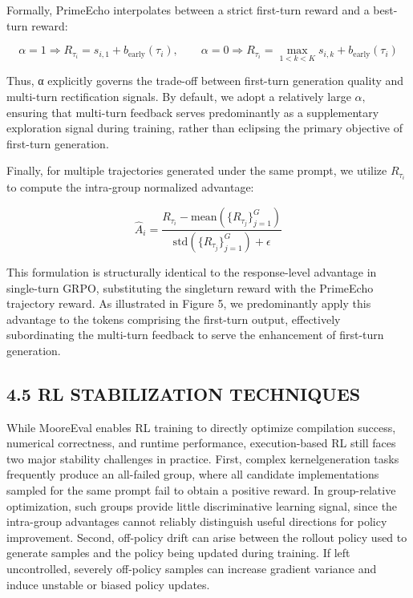 \documentclass[
  10
]{article}
\begin{document}
Formally, PrimeEcho interpolates between a strict first-turn reward and
a best-turn reward:

\[
\alpha = 1 \Rightarrow R _ {\tau_ {i}} = s _ {i, 1} + b _ {\mathrm{early}} (\tau_ {i}), \qquad \alpha = 0 \Rightarrow R _ {\tau_ {i}} = \max _ {1 <   k <   K} s _ {i, k} + b _ {\mathrm{early}} (\tau_ {i})\tag{11}
\]

Thus, α explicitly governs the trade-off between first-turn generation
quality and multi-turn rectification signals. By default, we adopt a
relatively large \(\alpha ,\) ensuring that multi-turn feedback serves
predominantly as a supplementary exploration signal during training,
rather than eclipsing the primary objective of first-turn generation.

Finally, for multiple trajectories generated under the same prompt, we
utilize \(R _ { \tau _ { i } }\) to compute the intra-group normalized
advantage:

\[
\hat {A} _ {i} = \frac {R _ {\tau_ {i}} - \mathrm{mean} (\{R _ {\tau_ {j}} \} _ {j = 1} ^ {G})}{\mathrm{std} (\{R _ {\tau_ {j}} \} _ {j = 1} ^ {G}) + \epsilon}\tag{12}
\]

This formulation is structurally identical to the response-level
advantage in single-turn GRPO, substituting the singleturn reward with
the PrimeEcho trajectory reward. As illustrated in Figure 5, we
predominantly apply this advantage to the tokens comprising the
first-turn output, effectively subordinating the multi-turn feedback to
serve the enhancement of first-turn generation.

\subsection{4.5 RL STABILIZATION
TECHNIQUES}\label{rl-stabilization-techniques}

While MooreEval enables RL training to directly optimize compilation
success, numerical correctness, and runtime performance, execution-based
RL still faces two major stability challenges in practice. First,
complex kernelgeneration tasks frequently produce an all-failed group,
where all candidate implementations sampled for the same prompt fail to
obtain a positive reward. In group-relative optimization, such groups
provide little discriminative learning signal, since the intra-group
advantages cannot reliably distinguish useful directions for policy
improvement. Second, off-policy drift can arise between the rollout
policy used to generate samples and the policy being updated during
training. If left uncontrolled, severely off-policy samples can increase
gradient variance and induce unstable or biased policy updates.
\end{document}
